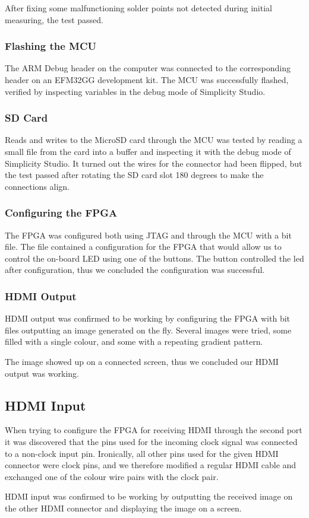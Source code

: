 After fixing some malfunctioning solder points not detected during initial measuring, the test passed.

\subsubsection{Flashing the MCU}
The ARM Debug header on the computer was connected to the corresponding header on an EFM32GG development kit. The MCU was successfully flashed, verified by inspecting variables in the debug mode of Simplicity Studio.

\subsubsection{SD Card}
Reads and writes to the MicroSD card through the MCU was tested by reading a small file from the card into a buffer and inspecting it with the debug mode of Simplicity Studio. It turned out the wires for the connector had been flipped, but the test passed after rotating the SD card slot 180 degrees to make the connections align.

\subsubsection{Configuring the FPGA}
The FPGA was configured both using JTAG and through the MCU with a bit file. The file contained a configuration for the FPGA that would allow us to control the on-board LED using one of the buttons. The button controlled the led after configuration, thus we concluded the configuration was successful.

\subsubsection{HDMI Output}
HDMI output was confirmed to be working by configuring the FPGA with bit files outputting an image generated on the fly.
Several images were tried, some filled with a single colour, and some with a repeating gradient pattern.

The image showed up on a connected screen, thus we concluded our HDMI output was working.

\subsection{HDMI Input}
When trying to configure the FPGA for receiving HDMI through the second port it was discovered that the pins used for the incoming clock signal was connected to a non-clock input pin.
Ironically, all other pins used for the given HDMI connector were clock pins, and we therefore modified a regular HDMI cable and exchanged one of the colour wire pairs with the clock pair.

HDMI input was confirmed to be working by outputting the received image on the other HDMI connector and displaying the image on a screen.
